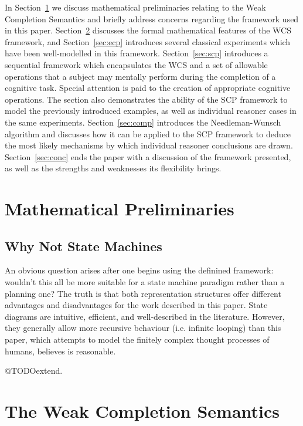 \documentclass{article}
\begin{document}
In Section~\ref{sec:prelim} we discuss mathematical preliminaries relating to the Weak Completion Semantics and briefly address concerns regarding the framework used in this paper. Section~\ref{sec:wcs} discusses the formal mathematical features of the WCS framework, and Section~\ref{sec:ecp} introduces several classical experiments which have been well-modelled in this framework. Section~\ref{sec:scp} introduces a sequential framework which encapsulates the WCS and a set of allowable operations that a subject may mentally perform during the completion of a cognitive task. Special attention is paid to the creation of appropriate cognitive operations. The section also demonstrates the ability of the SCP framework to model the previously introduced examples, as well as individual reasoner cases in the same experiments. Section~\ref{sec:comp} introduces the Needleman-Wunsch algorithm and discusses how it can be applied to the SCP framework to deduce the most likely mechanisms by which individual reasoner conclusions are drawn. Section~\ref{sec:conc} ends the paper with a discussion of the framework presented, as well as the strengths and weaknesses its flexibility brings.


\section{Mathematical Preliminaries} \label{sec:prelim}

\subsection{Why Not State Machines}
An obvious question arises after one begins using the definined framework: wouldn't this all be more suitable for a state machine paradigm rather than a planning one? The truth is that both representation structures offer different advantages and disadvantages for the work described in this paper. State diagrams are intuitive, efficient, and well-described in the literature. However, they generally allow more recursive behaviour (i.e. infinite looping) than this paper, which attempts to model the finitely complex thought processes of humans, believes is reasonable. 



@TODOextend. 

\section{The Weak Completion Semantics} \label{sec:wcs}
\end{document}

